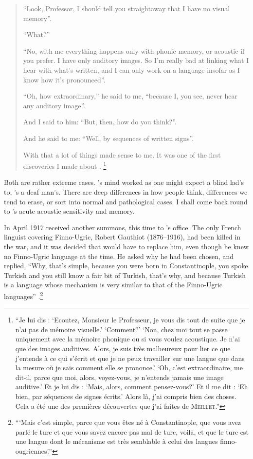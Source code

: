 \documentclass[output=paper]{langscibook}
\begin{document}
\begin{quote}
``Look, Professor, I should tell you straightaway that I have no visual memory''.


``What?''

``No, with me everything happens only with phonic memory, or acoustic if you prefer. I have only auditory images. So I'm really bad at linking what I hear with what’s written, and I can only work on a language insofar as I know how it’s pronounced''.

``Oh, how extraordinary,'' he said to me, ``because I, you see, never hear any auditory image''.

And I said to him: ``But, then, how do you think?''.

And he said to me: ``Well, by sequences of written signs''.

With that a lot of things made sense to me. It was one of the first discoveries I made about {\Meillet}. \citep[193]{Sauvageot1992}\footnote{``Je lui dis : `Ecoutez, Monsieur le Professeur, je vous dis tout de suite que je n'ai pas de mémoire visuelle.' `Comment?' `Non, chez moi tout se passe uniquement avec la mémoire phonique ou si vous voulez acoustique. Je n'ai que des images auditives. Alors, je suis très malheureux pour lier ce que j'entends à ce qui s'écrit et que je ne peux travailler sur une langue que dans la mesure où je sais comment elle se prononce.' `Oh, c'est extraordinaire, me dit-il, parce que moi, alors, voyez-vous, je n'entends jamais une image auditive.' Et je lui dis : `Mais, alors, comment pensez-vous?' Et il me dit : `Eh bien, par séquences de signes écrits.' Alors là, j'ai compris bien des choses. Cela a été une des premières découvertes que j'ai faites de \textsc{Meillet}.''}
\end{quote}

Both are rather extreme cases. {\Sauvageot}'s mind worked as one might expect a blind lad's to, {\Meillet}'s a deaf man's. There are deep differences in how people think, differences we tend to erase, or sort into normal and pathological cases. I shall come back round to {\Sauvageot}’s acute acoustic sensitivity and memory.

In April 1917 {\Sauvageot} received another summons, this time to {\Meillet}'s office. The only French linguist covering Finno-Ugric, Robert Gauthiot (1876--1916), had been killed in the war, and it was decided that {\Sauvageot} would have to replace him, even though he knew no Finno-Ugric language at the time. He asked why he had been chosen, and {\Meillet} replied, ``Why, that's simple, because you were born in Constantinople, you spoke Turkish and you still know a fair bit of Turkish, that's why, and because Turkish is a language whose mechanism is very similar to that of the Finno-Ugric languages'' \citep[194]{Sauvageot1992}.\footnote{```Mais c'est simple, parce que vous êtes né à Constantinople, que vous avez parlé le turc et que vous savez encore pas mal de turc, voilà, et que le turc est une langue dont le mécanisme est très semblable à celui des langues finno-ougriennes'.''}
\end{document}

